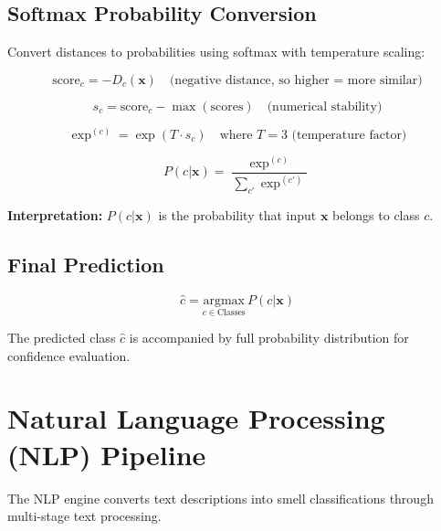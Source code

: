 \documentclass[10pt]{article}
\begin{document}
\subsection{Softmax Probability Conversion}

Convert distances to probabilities using softmax with temperature scaling:

\begin{equation}
\text{score}_c = -D_c(\mathbf{x}) \quad \text{(negative distance, so higher = more similar)}
\end{equation}

\begin{equation}
s_c = \text{score}_c - \max(\text{scores}) \quad \text{(numerical stability)}
\end{equation}

\begin{equation}
\exp^{(c)} = \exp(T \cdot s_c) \quad \text{where } T = 3 \text{ (temperature factor)}
\end{equation}

\begin{equation}
P(c|\mathbf{x}) = \frac{\exp^{(c)}}{\sum_{c'} \exp^{(c')}}
\end{equation}

\textbf{Interpretation:} $P(c|\mathbf{x})$ is the probability that input $\mathbf{x}$ belongs to class $c$.

\subsection{Final Prediction}

\begin{equation}
\hat{c} = \underset{c \in \text{Classes}}{\text{argmax}} \, P(c|\mathbf{x})
\end{equation}

The predicted class $\hat{c}$ is accompanied by full probability distribution for confidence evaluation.


\section{Natural Language Processing (NLP) Pipeline}

The NLP engine converts text descriptions into smell classifications through multi-stage text processing.
\end{document}
